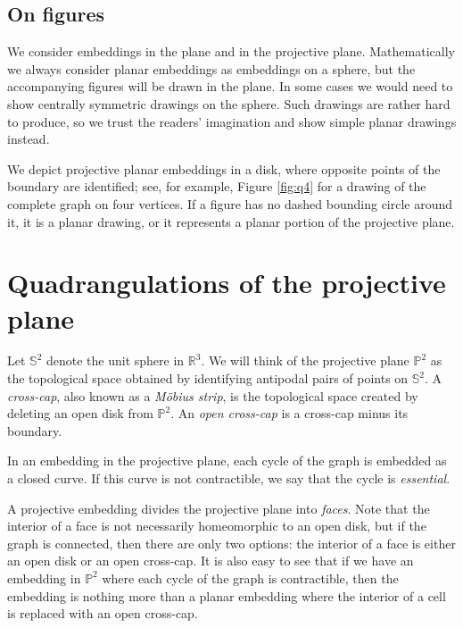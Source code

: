 \documentclass{article}
\newcommand{\R}[0]{\mathbb{R}}
\newcommand{\Pb}[0]{\mathbb{P}}
\newcommand{\Sb}[0]{\mathbb{S}}
\begin{document}
\subsection{On figures}
 We consider embeddings in the plane and in the projective plane. Mathematically we always consider planar embeddings as embeddings on a sphere, but the accompanying figures will be drawn in the plane. In some cases we would need to show centrally symmetric drawings on the sphere. Such drawings are rather hard to produce, so we trust the readers' imagination and show simple planar drawings instead.
 
 We depict projective planar embeddings in a disk, where opposite points of the boundary are identified; see, for example, Figure \ref{fig:q4} for a drawing of the complete graph on four vertices. If a figure has no dashed bounding circle around it, it is a planar drawing, or it represents a planar portion of the projective plane. 

 






\section{Quadrangulations of the projective plane} \label{sec:quad}
 Let $\Sb^2$ denote the unit sphere in $\R^3$. We will think of the projective plane $\Pb^2$ as the topological space obtained by identifying antipodal pairs of points on $\Sb^2$. A \emph{cross-cap}, also known as a \emph{Möbius strip}, is the topological space created by deleting an open disk from $\Pb^2$. An \emph{open cross-cap} is a cross-cap minus its boundary. 
 
 In an embedding in the projective plane, each cycle of the graph is embedded as a closed curve. If this curve is not contractible, we say that the cycle is \emph{essential}.  

 A projective embedding divides the projective plane into \emph{faces}. Note that the interior of a face is not necessarily homeomorphic to an open disk, but if the graph is connected, then there are only two options: the interior of a face is either an open disk or an open cross-cap. It is also easy to see that if we have an embedding in $\Pb^2$ where each cycle of the graph is contractible, then the embedding is nothing more than a planar embedding where the interior of a cell is replaced with an open cross-cap. 
\end{document}
